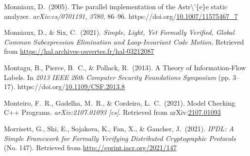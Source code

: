 \documentclass[12pt,twoside]{article}
\begin{document}
{\begin{thebibliography}{1079}
\mdbibitemlabel{}Monniaux, D.~(2005). The parallel implementation of the Astr\textbackslash{}’\{e\}e static analyzer. \emph{arXiv:cs/0701191}, \emph{3780}, 86–96. https://doi.org/\href{https://dx.doi.org/10.1007/11575467_7}{10.1007/11575467\_7}%

\mdbibitemlabel{}Monniaux, D., \& Six, C.~(2021). \emph{Simple, Light, Yet Formally Verified, Global Common Subexpression Elimination and Loop-Invariant Code Motion}. Retrieved from \href{https://hal.archives-ouvertes.fr/hal-03212087}{{\ttfamily https://\hspace{0pt}hal.\hspace{0pt}archives-\hspace{0pt}ouvertes.\hspace{0pt}fr/\hspace{0pt}hal-\hspace{0pt}03212087}}%

\mdbibitemlabel{}Montagu, B., Pierce, B.~C., \& Pollack, R.~(2013). A Theory of Information-Flow Labels. In \emph{2013 IEEE 26th Computer Security Foundations Symposium} (pp. 3–17). https://doi.org/\href{https://dx.doi.org/10.1109/CSF.2013.8}{10.1109/CSF.2013.8}%

\mdbibitemlabel{}Monteiro, F.~R., Gadelha, M.~R., \& Cordeiro, L.~C.~(2021). Model Checking C++ Programs. \emph{arXiv:2107.01093 {}[cs]}. Retrieved from arXiv:\href{http://arxiv.org/abs/2107.01093}{2107.01093}%

\mdbibitemlabel{}Morrisett, G., Shi, E., Sojakova, K., Fan, X., \& Gancher, J.~(2021). \emph{IPDL: A Simple Framework for Formally Verifying Distributed Cryptographic Protocols} (No. 147). Retrieved from \href{http://eprint.iacr.org/2021/147}{{\ttfamily http://\hspace{0pt}eprint.\hspace{0pt}iacr.\hspace{0pt}org/\hspace{0pt}2021/\hspace{0pt}147}}%


\end{thebibliography}}
\end{document}
